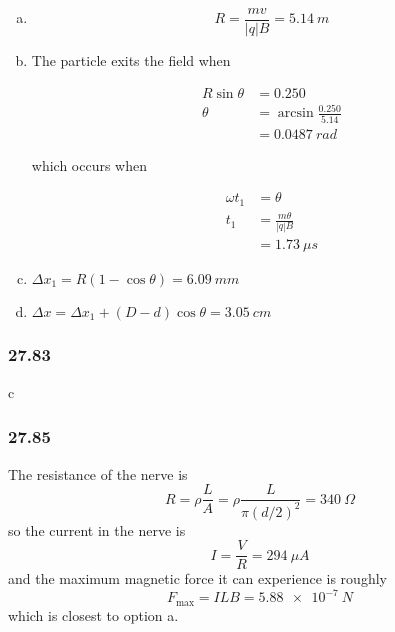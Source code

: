 \documentclass{article}
\begin{document}
\begin{enumerate}[(a)]
  \item \[R = \frac{m v}{|q| B} = \qty{5.14}{m}\]

  \item The particle exits the field when

        \begin{align*}
          R \sin \theta & = 0.250                      \\
          \theta        & = \arcsin \frac{0.250}{5.14} \\
                        & = \qty{0.0487}{rad}
        \end{align*}

        which occurs when

        \begin{align*}
          \omega t_1 & = \theta                 \\
          t_1        & = \frac{m \theta}{|q| B} \\
                     & = \qty{1.73}{\mu s}
        \end{align*}

  \item $\Delta x_1 = R (1 - \cos \theta) = \qty{6.09}{mm}$

  \item $\Delta x = \Delta x_1 + (D - d) \cos \theta = \qty{3.05}{cm}$
\end{enumerate}

\subsubsection{27.83}

c

\subsubsection{27.85}

The resistance of the nerve is \[R = \rho \frac{L}{A} = \rho \frac{L}{\pi (d / 2)^2} = \qty{340}{\Omega}\] so the current in the nerve is \[I = \frac{V}{R} = \qty{294}{\mu A}\] and the maximum magnetic force it can experience is roughly \[F_\textrm{max} = I L B = \qty{5.88e-7}{N}\] which is closest to option a.
\end{document}
